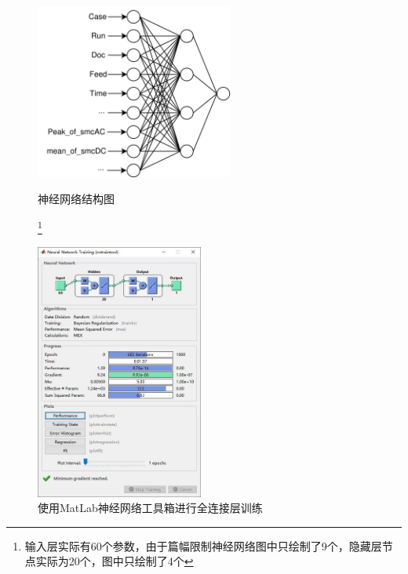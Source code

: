 \begin{figure}[htbp]
\begin{minipage}[t]{0.48\textwidth}
\centering
\includegraphics[width=6.5cm]{Chapter3/MLP.png}
\caption{神经网络结构图}
\footnote{输入层实际有60个参数，由于篇幅限制神经网络图中只绘制了9个，隐藏层节点实际为20个，图中只绘制了4个}
\end{minipage}
\begin{minipage}[t]{0.48\textwidth}
\centering
\includegraphics[width=5.5cm]{Chapter2/res.jpg}
\caption{使用MatLab神经网络工具箱进行全连接层训练}
\end{minipage}
\end{figure}
%
% 